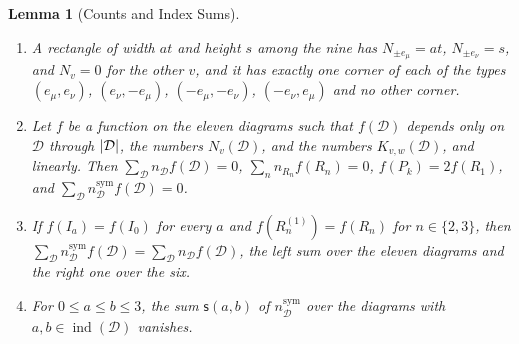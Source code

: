 \documentclass[11pt]{preprint}
\DeclarePairedDelimiter{\abs}{\lvert}{\rvert}
\numberwithin{equation}{section}
\newtheorem{lemma}[theorem]{Lemma}
\theoremstyle{definition}
\theoremstyle{remark}
\theoremstyle{plain}
\begin{document}
\begin{lemma}[Counts and Index Sums]\label{lem:witness-counts}
\begin{enumerate}[label=(\roman*)]
\item A rectangle of width $at$ and height $s$ among the nine has $N_{\pm e_\mu} = at$, $N_{\pm e_\nu} = s$, and $N_v = 0$ for the other $v$, and it has exactly one corner of each of the types $(e_\mu, e_\nu)$, $(e_\nu, -e_\mu)$, $(-e_\mu, -e_\nu)$, $(-e_\nu, e_\mu)$ and no other corner.
\item Let $f$ be a function on the eleven diagrams such that $f(\mathcal D)$ depends only on $\mathcal D$ through $\abs{\mathcal D}$, the numbers $N_v(\mathcal D)$, and the numbers $K_{v,w}(\mathcal D)$, and linearly. Then $\sum_{\mathcal D}n_{\mathcal D}f(\mathcal D) = 0$, $\sum_nn_{R_n}f(R_n) = 0$, $f(P_k) = 2f(R_1)$, and $\sum_{\mathcal D}n^{\mathrm{sym}}_{\mathcal D}f(\mathcal D) = 0$.
\item If $f(I_a) = f(I_0)$ for every $a$ and $f(R^{(1)}_n) = f(R_n)$ for $n \in \{ 2, 3 \}$, then $\sum_{\mathcal D}n^{\mathrm{sym}}_{\mathcal D}f(\mathcal D) = \sum_{\mathcal D}n_{\mathcal D}f(\mathcal D)$, the left sum over the eleven diagrams and the right one over the six.
\item For $0 \leq a \leq b \leq 3$, the sum $\mathsf s(a, b)$ of $n^{\mathrm{sym}}_{\mathcal D}$ over the diagrams with $a, b \in \operatorname{ind}(\mathcal D)$ vanishes.
\end{enumerate}
\end{lemma}
\end{document}
